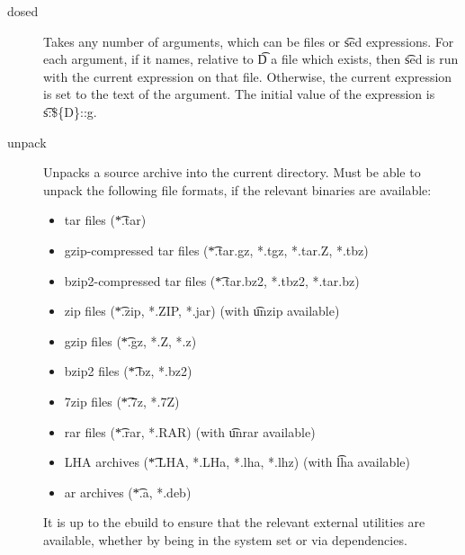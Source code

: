 \begin{description}
\item[dosed] Takes any number of arguments, which can be files or \t{sed} expressions. For each
    argument, if it names, relative to \t{D} a file which exists, then \t{sed} is run with the
    current expression on that file. Otherwise, the current expression is set to the text of the
    argument. The initial value of the expression is \t{s:\$\{D\}::g}.
\item[unpack] Unpacks a source archive into the current directory. Must be able to unpack the
    following file formats, if the relevant binaries are available:
    \begin{itemize}
    \item tar files (\t{*.tar})
    \item gzip-compressed tar files (\t{*.tar.gz, *.tgz, *.tar.Z, *.tbz})
    \item bzip2-compressed tar files (\t{*.tar.bz2, *.tbz2, *.tar.bz})
    \item zip files (\t{*.zip, *.ZIP, *.jar}) (with \t{unzip} available)
    \item gzip files (\t{*.gz, *.Z, *.z})
    \item bzip2 files (\t{*.bz, *.bz2})
    \item 7zip files (\t{*.7z, *.7Z})
    \item rar files (\t{*.rar, *.RAR}) (with \t{unrar} available)
    \item LHA archives (\t{*.LHA, *.LHa, *.lha, *.lhz}) (with \t{lha} available)
    \item ar archives (\t{*.a, *.deb})
    \end{itemize}
    It is up to the ebuild to ensure that the relevant external utilities are available, whether by
    being in the system set or via dependencies.
\end{description}

